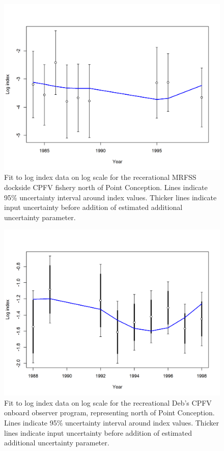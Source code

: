 \documentclass[12pt,]{article}
\begin{document}
\FloatBarrier 

\begin{figure}
\centering
\includegraphics{r4ss/plots_mod1/index5_logcpuefit_RecDocksideNorth.png}
\caption{Fit to log index data on log scale for the recerational MRFSS
dockside CPFV fishery north of Point Conception. Lines indicate 95\%
uncertainty interval around index values. Thicker lines indicate input
uncertainty before addition of estimated additional uncertainty
parameter. \label{fig:index5_logcpuefit_RecDocksideNorth}}
\end{figure}

\FloatBarrier

\begin{figure}
\centering
\includegraphics{r4ss/plots_mod1/index5_logcpuefit_DebCPFV.png}
\caption{Fit to log index data on log scale for the recreational Deb's
CPFV onboard observer program, representing north of Point Conception.
Lines indicate 95\% uncertainty interval around index values. Thicker
lines indicate input uncertainty before addition of estimated additional
uncertainty parameter. \label{fig:index5_logcpuefit_DebCPFV}}
\end{figure}
\end{document}
